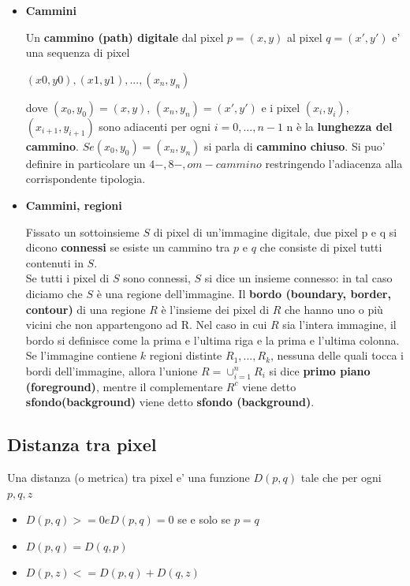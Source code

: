 \begin{itemize}
    \item \textbf{Cammini}

          Un \textbf{cammino (path) digitale} dal pixel $p = (x,y)$ al pixel $q = (x', y')$ e' una sequenza di pixel

          \begin{center}
              $(x0, y0), (x1, y1), ... ,(x_n, y_n)$
          \end{center}

          dove $(x_0, y_0) = (x,y)$, $(x_n, y_n) = (x', y')$ e i pixel $(x_i, y_i)$, $(x_{i+1}, y_{i+1})$ sono adiacenti per ogni $i=0, ... , n-1$
          n è la \textbf{lunghezza del cammino}. $Se (x_0, y_0) = (x_n, y_n)$ si parla di \textbf{cammino chiuso}. Si puo' definire in particolare un $4-, 8-, o m-cammino$ restringendo l'adiacenza alla corrispondente tipologia.

    \item \textbf{Cammini, regioni}

          Fissato un sottoinsieme $S$ di pixel di un'immagine digitale, due pixel p e q si dicono \textbf{connessi} se esiste un cammino tra $p$ e $q$ che consiste di pixel tutti contenuti in $S$.
          \\Se tutti i pixel di $S$ sono connessi, $S$ si dice un insieme connesso: in tal caso diciamo che $S$ è una regione dell'immagine.
          Il \textbf{bordo (boundary, border, contour)} di una regione $R$ è l'insieme dei pixel di $R$ che hanno uno o più vicini che non appartengono ad R.
          Nel caso in cui $R$ sia l'intera immagine, il bordo si definisce come la prima e l'ultima riga e la prima e l'ultima colonna.
          \\Se l'immagine contiene $k$ regioni distinte $R_1,..., R_k$, nessuna delle quali tocca i bordi dell'immagine, allora l'unione
          $R = \cup_{i=1}^n R_i$ si dice \textbf{primo piano (foreground)}, mentre il complementare $R^c$ viene detto \textbf{sfondo(background)}
          viene detto \textbf{sfondo (background)}.
\end{itemize}

\subsection{Distanza tra pixel}
Una distanza (o metrica) tra pixel e' una funzione $D(p, q)$ tale che per ogni $p, q, z$

\begin{itemize}
    \item $D(p, q) >= 0 e D(p, q) = 0$ se e solo se $p = q$
    \item $D(p, q) = D(q, p)$
    \item $D(p, z) <= D(p, q) + D(q, z)$
\end{itemize}


